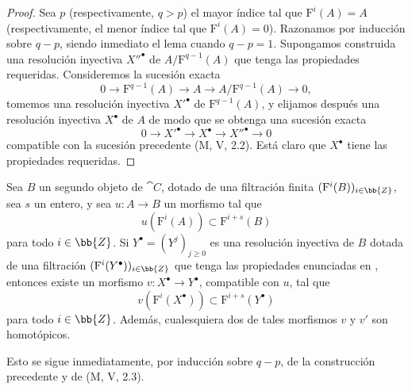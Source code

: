 \documentclass[oneside]{amsart}
\renewcommand{\geq}{\geqslant}
\let\EGAOriginalLabel\label
\renewcommand{\label}[1]{\phantomsection\EGAOriginalLabel{#1}}
\begin{document}
\begin{proof}
Sea $p$ (respectivamente, $q>p$) el mayor índice tal que
$\mathrm{F}^i(A)=A$ (respectivamente, el menor índice tal que
$\mathrm F^i(A)=0$).
Razonamos por inducción sobre $q-p$, siendo inmediato el lema cuando
$q-p=1$.
Supongamos construida una resolución inyectiva ${X''}^\bullet$ de
$A/\mathrm{F}^{q-1}(A)$ que tenga las propiedades requeridas.
Consideremos la sucesión exacta
\[
  0\longrightarrow\mathrm{F}^{q-1}(A)
  \longrightarrow A
  \longrightarrow A/\mathrm{F}^{q-1}(A)
  \longrightarrow0,
\]
tomemos una resolución inyectiva ${X'}^\bullet$ de
$\mathrm{F}^{q-1}(A)$, y elijamos después una resolución inyectiva
$X^\bullet$ de $A$ de modo que se obtenga una sucesión exacta
\[
  0\longrightarrow {X'}^\bullet
  \longrightarrow X^\bullet
  \longrightarrow {X''}^\bullet
  \longrightarrow0
\]
compatible con la sucesión precedente (M, V, 2.2).
Está claro que $X^\bullet$ tiene las propiedades requeridas.
\end{proof}

\begin{corollary}[13.6.3]
\label{0.13.6.3}
Sea $B$ un segundo objeto de $\cat{C}$, dotado de una filtración
finita $(\mathrm{F}^i(B))_{i\in\bb{Z}}$, sea $s$ un entero,
y sea $u:A\longrightarrow B$ un morfismo tal que
\[
  u(\mathrm{F}^i(A))\subset\mathrm{F}^{i+s}(B)
\]
para todo $i\in\bb{Z}$.
Si $Y^\bullet=(Y^j)_{j\geq0}$ es una resolución inyectiva de $B$
dotada de una filtración
$(\mathrm{F}^i(Y^\bullet))_{i\in\bb{Z}}$ que tenga las propiedades
enunciadas en , entonces existe un morfismo
$v:X^\bullet\longrightarrow Y^\bullet$, compatible con $u$, tal
que
\[
  v(\mathrm{F}^i(X^\bullet))
  \subset
  \mathrm{F}^{i+s}(Y^\bullet)
\]
para todo $i\in\bb{Z}$.
Además, cualesquiera dos de tales morfismos $v$ y $v'$ son homotópicos.
\end{corollary}

Esto se sigue inmediatamente, por inducción sobre $q-p$, de la construcción
precedente y de (M, V, 2.3).
\end{document}
